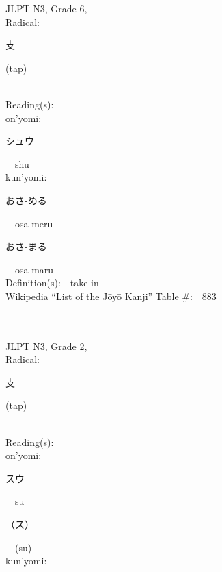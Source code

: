 \begin{multicols}{2}
{JLPT N3, Grade 6, \\Radical:\ \ {\begin{CJK}{UTF8}{min} 攴 \end{CJK}} (tap) } \\
Reading(s):\ \ \\
{\hspace*{1em}}on'yomi:\ \ \\
{\hspace*{2em}}{\begin{CJK}{UTF8}{min} シュウ \end{CJK}}\ \ sh\=u\ \ \\
{\hspace*{1em}}kun'yomi:\ \ \\
{\hspace*{2em}}{\begin{CJK}{UTF8}{min} おさ-める \end{CJK}}\ \ osa-meru\ \ \\
{\hspace*{2em}}{\begin{CJK}{UTF8}{min} おさ-まる \end{CJK}}\ \ osa-maru\ \ \\
Definition(s):\ \ take in \\
Wikipedia ``List of the J\=oy\=o Kanji'' Table \#:\ \ 883 \\
\ \ \\
{\fontsize{34pt}{40pt}  }\ \ \\  %
{JLPT N3, Grade 2, \\Radical:\ \ {\begin{CJK}{UTF8}{min} 攴 \end{CJK}} (tap) } \\
Reading(s):\ \ \\
{\hspace*{1em}}on'yomi:\ \ \\
{\hspace*{2em}}{\begin{CJK}{UTF8}{min} スウ \end{CJK}}\ \ s\=u\ \ \\
{\hspace*{2em}}{\begin{CJK}{UTF8}{min} （ス） \end{CJK}}\ \ (su)\ \ \\
{\hspace*{1em}}kun'yomi:\ \ \\

\end{multicols}
